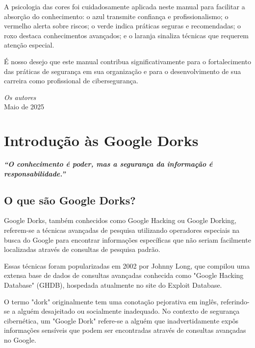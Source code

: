 \documentclass[12pt,a4paper]{book}
\begin{document}
A psicologia das cores foi cuidadosamente aplicada neste manual para facilitar a absorção do conhecimento: o azul transmite confiança e profissionalismo; o vermelho alerta sobre riscos; o verde indica práticas seguras e recomendadas; o roxo destaca conhecimentos avançados; e o laranja sinaliza técnicas que requerem atenção especial.

É nosso desejo que este manual contribua significativamente para o fortalecimento das práticas de segurança em sua organização e para o desenvolvimento de sua carreira como profissional de cibersegurança.

\vspace{1cm}
\begin{flushright}
\textit{Os autores}\\
Maio de 2025
\end{flushright}

\chapter{Introdução às Google Dorks}

\begin{tcolorbox}[colback=azulseguranca!5!white, colframe=azulseguranca]
\begin{center}
\textit{\textbf{``O conhecimento é poder, mas a segurança da informação é responsabilidade.''}}
\end{center}
\end{tcolorbox}

\section{O que são Google Dorks?}

Google Dorks, também conhecidos como Google Hacking ou Google Dorking, referem-se a técnicas avançadas de pesquisa utilizando operadores especiais na busca do Google para encontrar informações específicas que não seriam facilmente localizadas através de consultas de pesquisa padrão.

Essas técnicas foram popularizadas em 2002 por Johnny Long, que compilou uma extensa base de dados de consultas avançadas conhecida como "Google Hacking Database" (GHDB), hospedada atualmente no site do Exploit Database.

\begin{notebox}
O termo "dork" originalmente tem uma conotação pejorativa em inglês, referindo-se a alguém desajeitado ou socialmente inadequado. No contexto de segurança cibernética, um "Google Dork" refere-se a alguém que inadvertidamente expôs informações sensíveis que podem ser encontradas através de consultas avançadas no Google.
\end{notebox}
\end{document}
